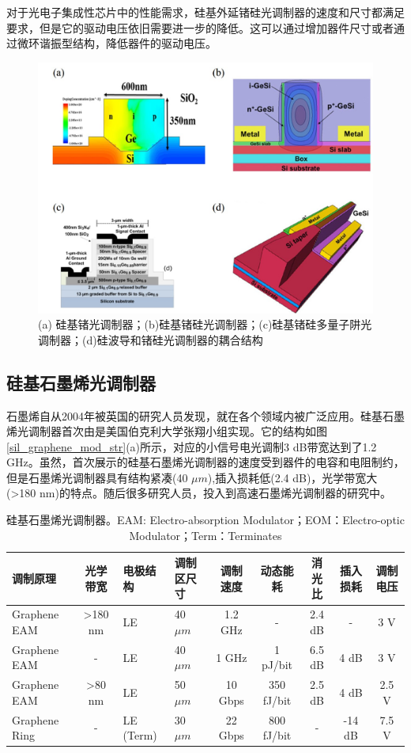对于光电子集成性芯片中的性能需求，硅基外延锗硅光调制器的速度和尺寸都满足要求，但是它的驱动电压依旧需要进一步的降低。这可以通过增加器件尺寸或者通过微环谐振型结构，降低器件的驱动电压。

\begin{figure}[htb]
	\centering
	\includegraphics[width=12cm]{./Pictures/fig_ge_mod.jpg}
	\caption{ (a) 硅基锗光调制器\cite{Srinivasan201656}；(b)硅基锗硅光调制器\cite{Dazeng2013high}；(c)硅基锗硅多量子阱光调制器\cite{chaisakul201223}；(d)硅波导和锗硅光调制器的耦合结构\cite{Dazeng2013high}}
	\label{fig_ge_mod}
\end{figure}
\subsection{硅基石墨烯光调制器}
石墨烯自从2004年被英国的研究人员发现\cite{novoselov2004electric}，就在各个领域内被广泛应用。硅基石墨烯光调制器首次由是美国伯克利大学张翔小组实现。它的结构如图\ref{sil_graphene_mod_str}(a)所示，对应的小信号电光调制3 dB带宽达到了1.2 GHz。虽然，首次展示的硅基石墨烯光调制器的速度受到器件的电容和电阻制约，但是石墨烯光调制器具有结构紧凑(40 $\mu m$),插入损耗低(2.4 dB)，光学带宽大(>180 nm)的特点。随后很多研究人员，投入到高速石墨烯光调制器的研究中。
{
	\begin{table}[htb]
		\caption{硅基石墨烯光调制器。EAM: Electro-absorption Modulator；EOM：Electro-optic Modulator；Term：Terminates}
		\label{sil_graphene_mod}
		\centering
		\begin{tabular}[t]{p{1.5cm}cp{0.8cm}p{1.2cm}ccccc}
			\hline
			调制原理 & 光学带宽 & 电极结构 & 调制区尺寸 & 调制速度 & 动态能耗 & 消光比 & 插入损耗 & 调制电压\\
			\hline
			Graphene EAM\cite{liu2011graphene} & >180 nm & LE  & 40 $\mu m$ & 1.2 GHz & - & 2.4 dB & - & 3 V\\
			Graphene EAM\cite{liu2012double} & -  & LE  & 40 $\mu m$ & 1 GHz & 1 pJ/bit & 6.5 dB & 4 dB & 3 V\\
			Graphene EAM\cite{hu2014broadband} & >80 nm & LE  & 50 $\mu m$ & 10 Gbps & 350 fJ/bit & 2.5 dB & 4 dB& 2.5 V\\
			Graphene Ring\cite{phare2015graphene} & - & LE (Term) & 30 $\mu m$ & 22 Gbps & 800 fJ/bit & - & -14 dB & 7.5 V\\
			\hline
		\end{tabular}
	\end{table}
}

